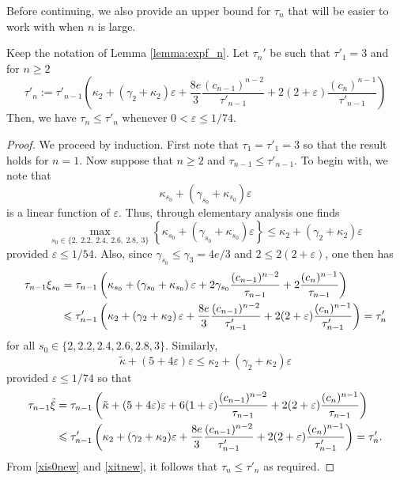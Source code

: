 \documentclass[12pt]{amsart}
\begin{document}
Before continuing, we also provide an upper bound for $\tau_n$ that will be easier to work with when $n$ is large.
\begin{lemma}\label{lem: taup}
    Keep the notation of Lemma \ref{lemma:expf_n}. Let $\tau_n'$ be such that $\tau'_1=3$ and for $n\ge 2$
    \begin{equation} 
    \label{eq:taup}
        \tau'_n:=\tau'_{n-1}\left(\kappa_2+(\gamma_2+\kappa_2)\varepsilon+\frac{8e}{3}\frac{(c_{n-1})^{n-2}}{\tau'_{n-1}}+2(2+\varepsilon)\frac{(c_n)^{n-1}}{\tau'_{n-1}}\right) 
    \end{equation}
    Then, we have $\tau_n\le\tau'_n$ whenever $0<\varepsilon\le 1/74$.
\end{lemma}
\begin{proof}
    We proceed by induction. First note that $\tau_1=\tau'_1=3$ so that the result holds for $n=1$. Now suppose that $n\ge 2$ and $\tau_{n-1}\le\tau'_{n-1}$. To begin with, we note that
    \begin{equation*}
        \kappa_{s_0}+(\gamma_{s_0}+\kappa_{s_0})\varepsilon
    \end{equation*}
    is a linear function of $\varepsilon$. Thus, through elementary analysis one finds
    \begin{equation*}
        \max_{s_0\in\{2,\:2.2,\:2.4,\:2.6,\:2.8,\:3\}}\left\{\kappa_{s_0}+(\gamma_{s_0}+\kappa_{s_0})\varepsilon\right\}\le \kappa_2+(\gamma_2+\kappa_2)\varepsilon
    \end{equation*}
    provided $\varepsilon\le 1/54$. Also, since $\gamma_{s_0}\le\gamma_3=4e/3$ and $2\le 2(2+\varepsilon)$, one then has
    \begin{align}
        \tau_{n-1}\xi_{s_0}&=\tau_{n-1}\left(\kappa_{s_0}+\left(\gamma_{s_0}+\kappa_{s_0}\right)\varepsilon+2\gamma_{s_0}\frac{(c_{n-1})^{n-2}}{\tau_{n-1}}+2\frac{(c_n)^{n-1}}{\tau_{n-1}}\right)\notag\\
        &\le \tau'_{n-1}\left(\kappa_{2}+\left(\gamma_{2}+\kappa_{2}\right)\varepsilon+\frac{8e}{3}\frac{(c_{n-1})^{n-2}}{\tau'_{n-1}}+2(2+\varepsilon)\frac{(c_n)^{n-1}}{\tau'_{n-1}}\right)=\tau'_n\label{xis0new}
    \end{align}
    for all $s_0\in\{2, 2.2, 2.4, 2.6, 2.8, 3\}$. Similarly,
    \begin{equation*}
        \tilde{\kappa}+(5+4\varepsilon)\varepsilon\le\kappa_2+(\gamma_2+\kappa_2)\varepsilon
    \end{equation*}
    provided $\varepsilon\le 1/74$ so that
    \begin{align}
        \tau_{n-1}\tilde{\xi}&=\tau_{n-1}\left(\tilde{\kappa}+(5+4\varepsilon)\varepsilon+6(1+\varepsilon)\frac{(c_{n-1})^{n-2}}{\tau_{n-1}}+2(2+\varepsilon)\frac{(c_n)^{n-1}}{\tau_{n-1}}\right)\notag\\
        &\le\tau'_{n-1}\left(\kappa_2+(\gamma_2+\kappa_2)\varepsilon+\frac{8e}{3}\frac{(c_{n-1})^{n-2}}{\tau'_{n-1}}+2(2+\varepsilon)\frac{(c_n)^{n-1}}{\tau'_{n-1}}\right)=\tau'_n\label{xitnew}.
    \end{align}
    From \eqref{xis0new} and \eqref{xitnew}, it follows that $\tau_n\le \tau'_n$ as required.
\end{proof}
\end{document}
